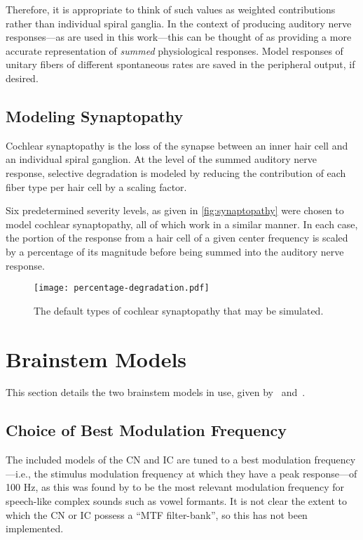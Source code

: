 Therefore, it is appropriate to think of such values as weighted contributions rather than individual spiral ganglia.  In the context of producing auditory nerve responses---as are used in this work---this can be thought of as providing a more accurate representation of \emph{summed} physiological responses. Model responses of unitary fibers of different spontaneous rates are saved in the peripheral output, if desired.

\subsection{Modeling Synaptopathy} %
\label{sub:modeling_synaptopathy}
Cochlear synaptopathy is the loss of the synapse between an inner hair cell and an individual spiral ganglion.  At the level of the summed auditory nerve response, selective degradation is modeled by reducing the contribution of each fiber type per hair cell by a scaling factor. 

Six predetermined severity levels, as given in \autoref{fig:synaptopathy} were chosen to model cochlear synaptopathy, all of which work in a similar manner.  In each case, the portion of the response from a hair cell of a given center frequency is scaled by a percentage of its magnitude before being summed into the auditory nerve response.  

\begin{figure}[htbp]
	\centering
	\texttt{[image: percentage-degradation.pdf]}
	\caption[Cochlear Synaptopathy Parameters]{The default types of cochlear synaptopathy that may be simulated.}
	\label{fig:synaptopathy}
\end{figure}

\section{Brainstem Models} %
\label{sec:brainstem_models}
This section details the two brainstem models in use, given by~\cite{Nelson2004Phenomenological} and~\cite{Carney2015Speech}.

\subsection{Choice of Best Modulation Frequency}
The included models of the CN and IC are tuned to a best modulation frequency---i.e., the stimulus modulation frequency at which they have a peak response---of 100 Hz, as this was found by \citeauthor{Carney2015Speech} to be the most relevant modulation frequency for speech-like complex sounds such as vowel formants.   It is not clear the extent to which the CN or IC possess a ``MTF filter-bank'', so this has not been implemented.

